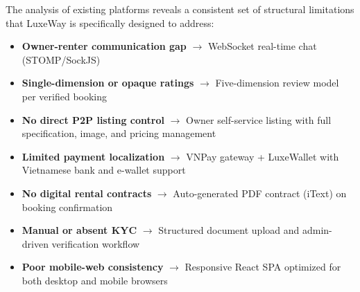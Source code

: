 The analysis of existing platforms reveals a consistent set of structural limitations that LuxeWay is specifically designed to address:

\begin{itemize}
    \item \textbf{Owner-renter communication gap} $\rightarrow$ WebSocket real-time chat (STOMP/SockJS)
    \item \textbf{Single-dimension or opaque ratings} $\rightarrow$ Five-dimension review model per verified booking
    \item \textbf{No direct P2P listing control} $\rightarrow$ Owner self-service listing with full specification, image, and pricing management
    \item \textbf{Limited payment localization} $\rightarrow$ VNPay gateway + LuxeWallet with Vietnamese bank and e-wallet support
    \item \textbf{No digital rental contracts} $\rightarrow$ Auto-generated PDF contract (iText) on booking confirmation
    \item \textbf{Manual or absent KYC} $\rightarrow$ Structured document upload and admin-driven verification workflow
    \item \textbf{Poor mobile-web consistency} $\rightarrow$ Responsive React SPA optimized for both desktop and mobile browsers
\end{itemize}

